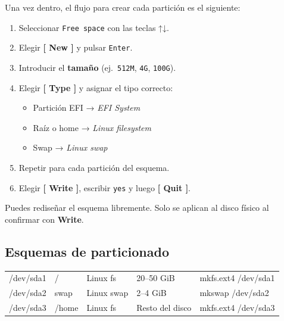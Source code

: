 Una vez dentro, el flujo para crear cada partición es el siguiente:
\begin{enumerate}
  \item Seleccionar \texttt{Free space} con las teclas ↑↓.
  \item Elegir \textbf{[ New ]} y pulsar \texttt{Enter}.
  \item Introducir el \textbf{tamaño} (ej.\ \texttt{512M}, \texttt{4G}, \texttt{100G}).
  \item Elegir \textbf{[ Type ]} y asignar el tipo correcto:
    \begin{itemize}
      \item Partición EFI → \textit{EFI System}
      \item Raíz o home → \textit{Linux filesystem}
      \item Swap → \textit{Linux swap}
    \end{itemize}
  \item Repetir para cada partición del esquema.
  \item Elegir \textbf{[ Write ]}, escribir \texttt{yes} y luego \textbf{[ Quit ]}.
\end{enumerate}

\begin{tcolorbox}[colback=orange!8, colframe=orange!70!black,
  title={\faExclamationTriangle\hspace*{0.5em} Los cambios no se graban hasta Write}]
Puedes rediseñar el esquema libremente. Solo se aplican al disco físico
al confirmar con \textbf{Write}.
\end{tcolorbox}

\subsection{Esquemas de particionado}

\begin{tcolorbox}[title=Esquema MBR (BIOS legacy) — SATA]
\begin{ttfamily}
  \begin{tabular}{lllll}
    {\color{blue}/dev/sda1} & {\color{red}/}     & {\color{brown}Linux fs}   & 20--50 GiB       & {\color{orange}mkfs.ext4 /dev/sda1} \\
    {\color{blue}/dev/sda2} & {\color{red}swap}  & {\color{brown}Linux swap} & 2--4 GiB         & {\color{orange}mkswap /dev/sda2} \\
    {\color{blue}/dev/sda3} & {\color{red}/home} & {\color{brown}Linux fs}   & Resto del disco  & {\color{orange}mkfs.ext4 /dev/sda3} \\
  \end{tabular}
\end{ttfamily}
\end{tcolorbox}

